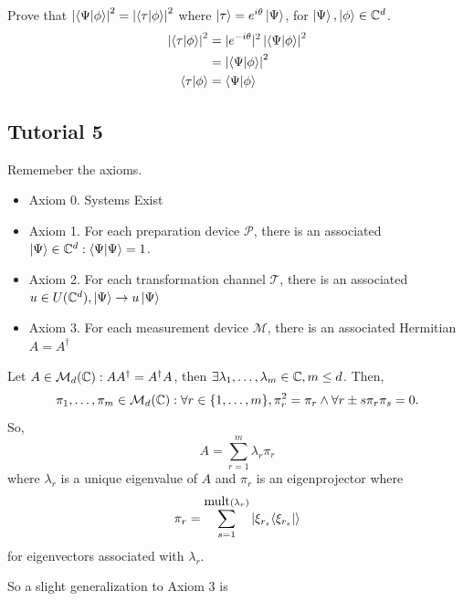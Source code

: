 \documentclass[english, 11pt]{article}
\begin{document}
      \begin{exmp}
        Prove that $\left|\braket{\Psi}{\phi}\right|^2 = \left|\braket{\tau}{\phi}\right|^2$ where $\left|\tau\right\rangle = e^{i\theta} \left|\Psi\right\rangle$, for $\left|\Psi\right\rangle, \left|\phi\right\rangle \in {\mathbb{C}}^d$.
        \newline
        \begin{align*}
          \left|\braket{\tau}{\phi}\right|^2 & = |e^{-i\theta}|^2\left|\braket{\Psi}{\phi}\right|^2 \\
          & = \left|\braket{\Psi}{\phi}\right|^2 \\ \braket{\tau}{\phi} & = \braket{\Psi}{\phi}
        \end{align*}
      \end{exmp}

     \subsection{Tutorial 5}

       Rememeber the axioms.

        \begin{itemize}
        \item Axiom 0. Systems Exist
        \item Axiom 1. For each preparation device $\mathcal{P}$, there is an associated $\ket{\Psi} \in \C^d : \braket{\Psi}{\Psi} = 1$.
        \item Axiom 2. For each transformation channel $\mathcal{T}$, there is an associated $u \in U({\mathbb{C}}^d), \left|\Psi\right\rangle \rightarrow u\left|\Psi\right\rangle$
        \item Axiom 3. For each measurement device $\mathcal{M}$, there is an associated Hermitian $A = A^\dagger$
      \end{itemize}

      \begin{thrm}
        Let $A \in \mathcal{M}_d({\mathbb{C}}): AA^\dagger = A^\dagger A$, then $\exists \lambda_1, \ldots, \lambda_m \in {\mathbb{C}}, m \leq d$. Then,
        \[ \pi_1,\ldots,\pi_m \in \mathcal{M}_d({\mathbb{C}}) : \forall r \in \{1,\ldots,m\}, \pi_r^2 = \pi_r \land \forall r \pm s \pi_r\pi_s = 0. \]
        So,
        \[ A = \sum_{r=1}^m \lambda_r\pi_r \]
        where $\lambda_r$ is a unique eigenvalue of $A$ and $\pi_r$ is an eigenprojector where
        \[ \pi_r = \sum_{s=1}^{\mbox{mult}(\lambda_r)} \left|\xi_{r_s}{\left\langle\xi_{r_s}\right|}\right\rangle \]
        for eigenvectors associated with $\lambda_r$.
      \end{thrm}

      So a slight generalization to Axiom 3 is \newline
\end{document}
